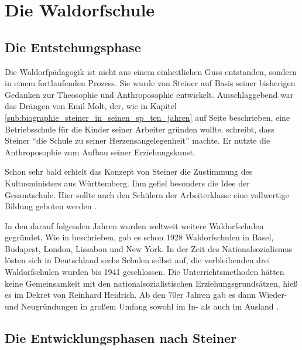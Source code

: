 \section{Die Waldorfschule}

\subsection{Die Entstehungsphase} %
\label{sub:die_entstehungsphase}

Die Waldorfpädagogik ist nicht aus einem einheitlichen Guss entstanden, sondern in einem fortlaufenden Prozess. Sie wurde von Steiner auf Basis seiner bisherigen Gedanken zur Theosophie und Anthroposophie entwickelt. Ausschlaggebend war das Drängen von Emil Molt, der, wie in Kapitel \ref{sub:biographie_steiner_in_seinen_sp_ten_jahren} auf Seite \pageref{sub:biographie_steiner_in_seinen_sp_ten_jahren} beschrieben, eine Betriebsschule für die Kinder seiner Arbeiter gründen wollte. \citet[S. 125]{hemleben63} schreibt, dass Steiner \enquote{die Schule zu seiner Herzensangelegenheit} machte. Er nutzte die Anthroposophie zum Aufbau seiner Erziehungskunst.

Schon sehr bald erhielt das Konzept von Steiner die Zustimmung des Kultusministers aus Württemberg. Ihm gefiel besonders die Idee der Gesamtschule. Hier sollte auch den Schülern der Arbeiterklasse eine vollwertige Bildung geboten werden \citep[vgl.][S. 279]{frielingsdorf12}. 

In den darauf folgenden Jahren wurden weltweit weitere Waldorfschulen gegründet. Wie in \citet{wikipedia2} beschrieben, gab es schon 1928 Waldorfschulen in Basel, Budapest, London, Lissabon und New York. In der Zeit des Nationalsozialismus lösten sich in Deutschland sechs Schulen selbst auf, die verbleibenden drei Waldorfschulen wurden bis 1941 geschlossen. Die Unterrichtsmethoden hätten  keine Gemeinsamkeit mit den nationalsozialistischen Erziehungsgrundsätzen, hieß es im Dekret von Reinhard Heidrich. Ab den 70er Jahren gab es dann Wieder- und Neugründungen in großem Umfang sowohl im In- als auch im Ausland \citep[vgl.][]{wikipedia2}. 


\subsection{Die Entwicklungsphasen nach Steiner} %
\label{sub:Ziele, Besonderheiten, Rolle von Lehrern und Schülern}

